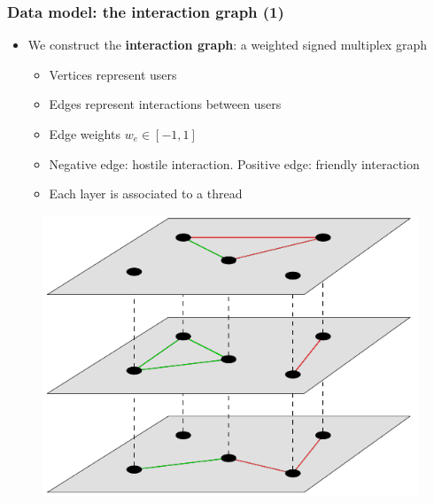 \documentclass[aspectratio=169]{beamer}
\begin{document}
\begin{frame}[c]
	\frametitle{Data model: the interaction graph (1)}
	\begin{itemize}
		\item We construct the \textbf{interaction graph}: a weighted signed
		      multiplex graph
		      \begin{itemize}
			      \item Vertices represent users
			            \pause
			      \item Edges represent interactions between users
			            \pause
			      \item Edge weights $w_e \in [-1, 1]$
			            \pause
			      \item {\color{red}Negative} edge: hostile interaction.
				            {\color{green}Positive} edge: friendly interaction
			            \pause
			      \item Each layer is associated to a thread
		      \end{itemize}
	\end{itemize}
	\pause
	\begin{figure}
		\centering
		\includegraphics[width=0.3\linewidth]{img/multiplex-signed-graph.png}
	\end{figure}
\end{frame}

\end{document}
